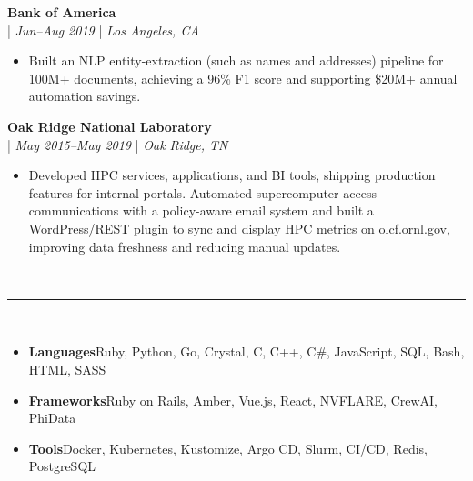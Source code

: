\documentclass[11pt,a4paper]{article}
\newcommand{\resumesection}[1]{
    \vspace{3pt}                                    %
    \noindent{\fontsize{13.65}{16}\selectfont\textbf{#1}}\\[-8pt]                    %
    \noindent\textcolor{gray}{\rule{\textwidth}{2pt}}\\[-5pt]  %
    \vspace{-8pt}                                   %
}
\newcommand{\regbullet}[1]{
    \item {\fontsize{10}{12}\selectfont #1}
}
\begin{document}
\vspace{8pt}
\noindent\textbf{Bank of America}\\
  |  {\fontsize{10}{12}\selectfont\textit{Jun--Aug 2019}}  |  {\fontsize{10}{12}\selectfont\textit{Los Angeles, CA}}
\begin{itemize}[leftmargin=18pt,itemsep=1pt,topsep=0pt]
\regbullet{Built an NLP entity-extraction (such as names and addresses) pipeline for 100M+ documents, achieving a 96\% F1 score and supporting \$20M+ annual automation savings.}
\end{itemize}

\vspace{8pt}
\noindent\textbf{Oak Ridge National Laboratory}\\
  |  {\fontsize{10}{12}\selectfont\textit{May 2015--May 2019}}  |  {\fontsize{10}{12}\selectfont\textit{Oak Ridge, TN}}
\begin{itemize}[leftmargin=18pt,itemsep=1pt,topsep=0pt]
\regbullet{Developed HPC services, applications, and BI tools, shipping production features for internal portals. Automated supercomputer-access communications with a policy-aware email system and built a WordPress/REST plugin to sync and display HPC metrics on olcf.ornl.gov, improving data freshness and reducing manual updates.}
\end{itemize}
\vspace{8pt}




\resumesection{Skills}

\begin{itemize}[leftmargin=18pt,itemsep=1pt,topsep=0pt]
    \regbullet{\textbf{Languages}\hspace{23pt}Ruby, Python, Go, Crystal, C, C++, C\#, JavaScript, SQL, Bash, HTML, SASS}

    \regbullet{\textbf{Frameworks}\hspace{13pt}Ruby on Rails, Amber, Vue.js, React, NVFLARE, CrewAI, PhiData}

    \regbullet{\textbf{Tools}\hspace{50pt}Docker, Kubernetes, Kustomize, Argo CD, Slurm, CI/CD, Redis, PostgreSQL}
\end{itemize}
\vspace{4pt}
\end{document}

